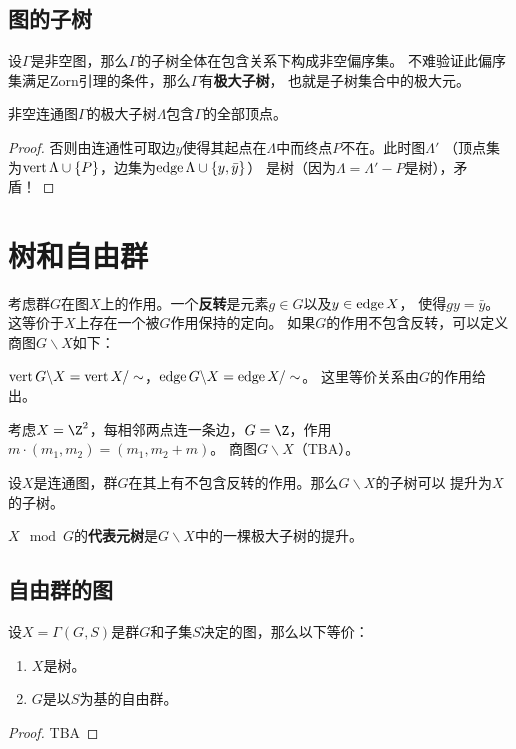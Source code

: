 \subsection{图的子树}
设$\Gamma$是非空图，那么$\Gamma$的子树全体在包含关系下构成非空偏序集。
不难验证此偏序集满足Zorn引理的条件，那么$\Gamma$有\textbf{极大子树}，
也就是子树集合中的极大元。
\begin{proposition}
    非空连通图$\Gamma$的极大子树$\Lambda$包含$\Gamma$的全部顶点。
\end{proposition}
\begin{proof}
    否则由连通性可取边$y$使得其起点在$\Lambda$中而终点$P$不在。此时图$\Lambda'$
    （顶点集为$\operatorname{vert} \Lambda \cup \{P\}$，边集为$\operatorname{edge} \Lambda \cup \{y,\bar{y}\}$）
    是树（因为$\Lambda = \Lambda'-P$是树），矛盾！
\end{proof}
\section{树和自由群}
考虑群$G$在图$X$上的作用。一个\textbf{反转}是元素$g \in G$以及$y \in \operatorname{edge} X$，
使得$gy = \bar{y}$。这等价于$X$上存在一个被$G$作用保持的定向。
如果$G$的作用不包含反转，可以定义商图$G\backslash X$如下：
\begin{definition}
    $\operatorname{vert} G\backslash X = \operatorname{vert} X/\sim$，$\operatorname{edge} G\backslash X = \operatorname{edge} X/\sim$。
    这里等价关系由$G$的作用给出。
\end{definition}
\begin{example}
    考虑$X = \Z^2$，每相邻两点连一条边，$G = \Z$，作用$m\cdot(m_1,m_2) = (m_1,m_2+m)$。
    商图$G\backslash X$（TBA）。
\end{example}
\begin{proposition}\label{prop-up}
    设$X$是连通图，群$G$在其上有不包含反转的作用。那么$G \backslash X$的子树可以
    提升为$X$的子树。
\end{proposition}
\begin{definition}
    $X \mod{G}$的\textbf{代表元树}是$G\backslash X$中的一棵极大子树的提升。
\end{definition}
\subsection{自由群的图}
\begin{proposition}
    设$X = \Gamma(G,S)$是群$G$和子集$S$决定的图，那么以下等价：
    \begin{enumerate}
        \item $X$是树。
        \item $G$是以$S$为基的自由群。
    \end{enumerate}
\end{proposition}
\begin{proof}
    TBA
\end{proof}
